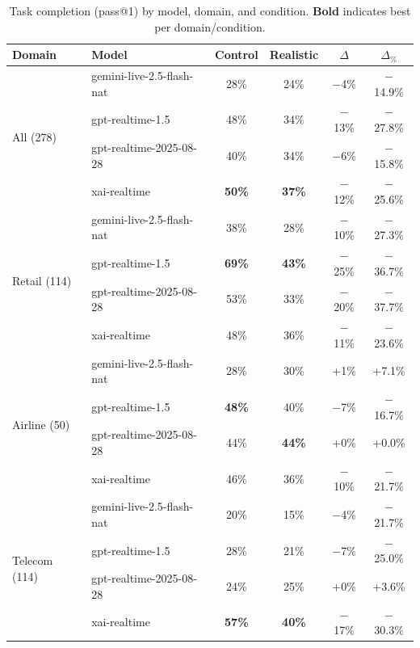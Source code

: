 \begin{table}[h]
\caption{Task completion (pass@1) by model, domain, and condition. \textbf{Bold} indicates best per domain/condition.}
\label{tab:main-results}
\centering
\begin{small}
\begin{tabular}{llcccc}
\toprule
\textbf{Domain} & \textbf{Model} & \textbf{Control} & \textbf{Realistic} & \textbf{$\Delta$} & \textbf{$\Delta_{\%}$} \\
\midrule
\multirow{4}{*}{All (278)} & gemini-live-2.5-flash-nat & 28\% & 24\% & $-$4\% & $-$14.9\% \\
 & gpt-realtime-1.5 & 48\% & 34\% & $-$13\% & $-$27.8\% \\
 & gpt-realtime-2025-08-28 & 40\% & 34\% & $-$6\% & $-$15.8\% \\
 & xai-realtime & \textbf{50\%} & \textbf{37\%} & $-$12\% & $-$25.6\% \\
\midrule
\multirow{4}{*}{Retail (114)} & gemini-live-2.5-flash-nat & 38\% & 28\% & $-$10\% & $-$27.3\% \\
 & gpt-realtime-1.5 & \textbf{69\%} & \textbf{43\%} & $-$25\% & $-$36.7\% \\
 & gpt-realtime-2025-08-28 & 53\% & 33\% & $-$20\% & $-$37.7\% \\
 & xai-realtime & 48\% & 36\% & $-$11\% & $-$23.6\% \\
\midrule
\multirow{4}{*}{Airline (50)} & gemini-live-2.5-flash-nat & 28\% & 30\% & +1\% & +7.1\% \\
 & gpt-realtime-1.5 & \textbf{48\%} & 40\% & $-$7\% & $-$16.7\% \\
 & gpt-realtime-2025-08-28 & 44\% & \textbf{44\%} & +0\% & +0.0\% \\
 & xai-realtime & 46\% & 36\% & $-$10\% & $-$21.7\% \\
\midrule
\multirow{4}{*}{Telecom (114)} & gemini-live-2.5-flash-nat & 20\% & 15\% & $-$4\% & $-$21.7\% \\
 & gpt-realtime-1.5 & 28\% & 21\% & $-$7\% & $-$25.0\% \\
 & gpt-realtime-2025-08-28 & 24\% & 25\% & +0\% & +3.6\% \\
 & xai-realtime & \textbf{57\%} & \textbf{40\%} & $-$17\% & $-$30.3\% \\
\bottomrule
\end{tabular}
\end{small}
\end{table}